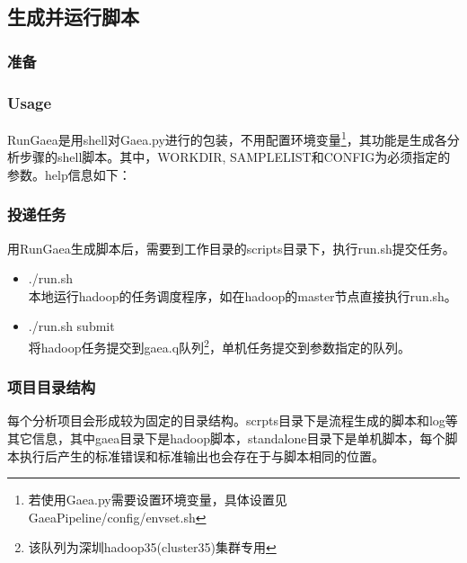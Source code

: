 \documentclass[UTF8,10pt,a4paper]{ctexart}
\begin{document}
\newpage
\subsection{生成并运行脚本}
\label{sec:3}
\subsubsection{准备}


\subsubsection{Usage}
RunGaea是用shell对Gaea.py进行的包装，不用配置环境变量\footnote{若使用Gaea.py需要设置环境变量，具体设置见GaeaPipeline/config/envset.sh}，其功能是生成各分析步骤的shell脚本。其中，WORKDIR, SAMPLELIST和CONFIG为必须指定的参数。help信息如下：

\subsubsection{投递任务}
用RunGaea生成脚本后，需要到工作目录的scripts目录下，执行run.sh提交任务。
\begin{itemize}
\item ./run.sh\\
	本地运行hadoop的任务调度程序，如在hadoop的master节点直接执行run.sh。
\item ./run.sh submit\\
	将hadoop任务提交到gaea.q队列\footnote{该队列为深圳hadoop35(cluster35)集群专用}，单机任务提交到参数指定的队列。
\end{itemize}


\newpage
\subsubsection{项目目录结构}
%
每个分析项目会形成较为固定的目录结构。scrpts目录下是流程生成的脚本和log等其它信息，其中gaea目录下是hadoop脚本，standalone目录下是单机脚本，每个脚本执行后产生的标准错误和标准输出也会存在于与脚本相同的位置。%
\end{document}
